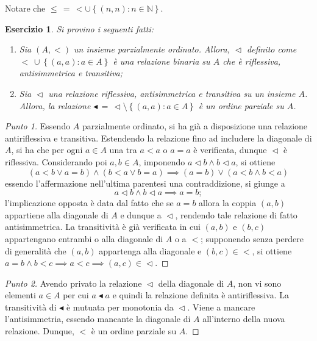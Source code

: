\documentclass[fontsize = 11 pt, paper=A4, oneside, index=totoc, hyperref]{article}
\theoremstyle{definition}
\theoremstyle{plain}
\newtheorem{exe}{Esercizio}[section]
\newcommand{\N}{\mathbb{N}}
\newcommand{\order}{\vartriangleleft}
\begin{document}
Notare che \(\le\, =\, < \cup \left\lbrace (n,n) \colon n \in \N \right\rbrace\).

\begin{exe}
  Si provino i seguenti fatti:
  \begin{enumerate}
    \item Sia \((A, <)\) un insieme parzialmente ordinato. Allora, \(\order\) definito come  \(<\,\cup \left\lbrace (a,a) \colon a \in A \right\rbrace\) è una relazione binaria su \(A\) che è riflessiva, antisimmetrica e transitiva;
    \item Sia \(\order\) una relazione riflessiva, antisimmetrica e transitiva su un insieme \(A\). Allora, la relazione \(\blacktriangleleft\, =\, \order \setminus \left\lbrace (a,a) \colon a \in A \right\rbrace\) è un ordine parziale su \(A\).
  \end{enumerate}
\end{exe}
\begin{proof}[Punto 1]
  Essendo \(A\) parzialmente ordinato, si ha già a disposizione una relazione antiriflessiva e transitiva. Estendendo la relazione fino ad includere la diagonale di \(A\), si ha che per ogni \(a \in A\) una tra \(a < a\) o \(a = a\) è verificata, dunque \(\order\) è riflessiva. Considerando poi \(a, b \in A\), imponendo \(a \order b \land b \order a\), si ottiene
  \[
  (a < b \lor a = b) \land (b < a \lor b = a) \implies (a = b) \lor (a < b \land b < a)
  \]
  essendo l'affermazione nell'ultima parentesi una contraddizione, si giunge a
  \[
  a \order b \land b \order a \implies a = b;
  \]
  l'implicazione opposta è data dal fatto che se \(a = b\) allora la coppia \((a,b)\) appartiene alla diagonale di \(A\) e dunque a \(\order\), rendendo tale relazione di fatto antisimmetrica. La transitività è già verificata in cui \((a,b)\) e \((b,c)\) appartengano entrambi o alla diagonale di \(A\) o a \(<\); supponendo senza perdere di generalità che \((a,b)\) appartenga alla diagonale e \((b,c) \in <\), si ottiene \(a = b \land b < c \implies a < c \implies (a,c) \in \order\).
\end{proof}
\begin{proof}[Punto 2]
Avendo privato la relazione \(\order\) della diagonale di \(A\), non vi sono elementi \(a \in A\) per cui \(a \blacktriangleleft a\) e quindi la relazione definita è antiriflessiva. La transitività di \(\blacktriangleleft\) è mutuata per monotonia da \(\order\). Viene a mancare l'antisimmetria, essendo mancante la diagonale di \(A\) all'interno della nuova relazione. Dunque, \(<\) è un ordine parziale su \(A\).
\end{proof}
\end{document}
